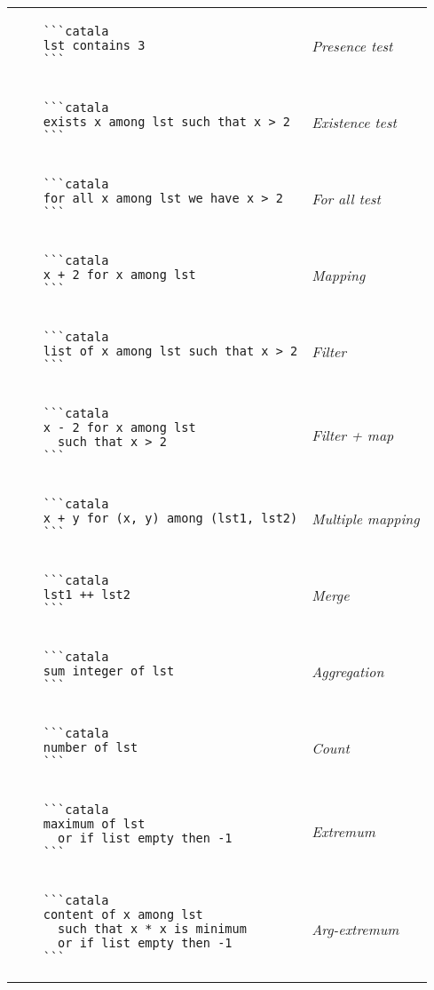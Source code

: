 \documentclass{article}
\makeatletter
\newenvironment{catala}{%
  \VerbatimEnvironment
  \let\FV@ListVSpace\relax
  \begin{verbatim}}%
 {\end{verbatim}}
\makeatother
\begin{document}
\begin{multicols}{3}
\begin{tabular}{@{}p{\cola}>{\slshape}p{\colb}@{}}
  \begin{catala}
    ```catala
    lst contains 3
    ```
  \end{catala}
  & Presence test
  \\
  \begin{catala}
    ```catala
    exists x among lst such that x > 2
    ```
  \end{catala}
  & Existence test
  \\
  \begin{catala}
    ```catala
    for all x among lst we have x > 2
    ```
  \end{catala}
  & For all test
  \\
  \begin{catala}
    ```catala
    x + 2 for x among lst
    ```
  \end{catala}
  & Mapping
  \\
  \begin{catala}
    ```catala
    list of x among lst such that x > 2
    ```
  \end{catala}
  & Filter
  \\
  \begin{catala}
    ```catala
    x - 2 for x among lst
      such that x > 2
    ```
  \end{catala}
  & Filter + map
  \\
  \begin{catala}
    ```catala
    x + y for (x, y) among (lst1, lst2)
    ```
  \end{catala}
  & Multiple mapping
  \\
  \begin{catala}
    ```catala
    lst1 ++ lst2
    ```
  \end{catala}
  & Merge
  \\
  \begin{catala}
    ```catala
    sum integer of lst
    ```
  \end{catala}
  & Aggregation
  \\
  \begin{catala}
    ```catala
    number of lst
    ```
  \end{catala}
  & Count
  \\
  \begin{catala}
    ```catala
    maximum of lst
      or if list empty then -1
    ```
  \end{catala}
  & Extremum
  \\
  \begin{catala}
    ```catala
    content of x among lst
      such that x * x is minimum
      or if list empty then -1
    ```
  \end{catala}
  & Arg-extremum
  \\
\end{tabular}

\end{multicols}
\end{document}
